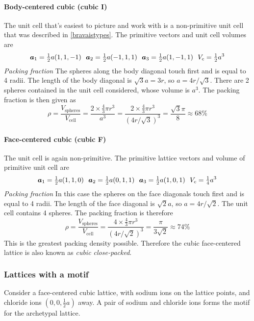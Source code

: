 \paragraph{Body-centered cubic (cubic I)} 
The unit cell that's easiest to picture and work with is a non-primitive unit cell that was described in \cref{bravaistypes}. The primitive vectors and unit cell volumes are 
\begin{equation*}
	\bvec{a}_1=\tfrac{1}{2}a(1,1,-1)\ \ \bvec{a}_2=\tfrac{1}{2}a(-1,1,1)\ \ \bvec{a}_3=\tfrac{1}{2}a(1,-1,1)\ \ V_c=\tfrac{1}{2}a^3
\end{equation*}
\emph{Packing fraction}
The spheres along the body diagonal touch first and is equal to 4 radii. The length of the body diagonal is $\sqrt{3}a=3r$, so $a=4r/\sqrt{3}$. There are 2 spheres contained in the unit cell considered, whose volume is $a^3$. The packing fraction is then given as
\begin{equation}
 	\rho=\frac{V_{\mathrm{spheres}}}{V_{\mathrm{cell}}}=\frac{2\times\tfrac{4}{3}\pi r^3}{a^3}=\frac{2\times\tfrac{4}{3}\pi r^3}{(4r/\sqrt{3})^3}=\frac{\sqrt{3}\pi}{8}\approx68\%
\end{equation} 
\paragraph{Face-centered cubic (cubic F)} 
The unit cell is again non-primitive. The primitive lattice vectors and volume of primitive unit cell are
\begin{equation}
	\bvec{a}_1=\tfrac{1}{2}a(1,1,0)\ \ \bvec{a}_2=\tfrac{1}{2}a(0,1,1)\ \ \bvec{a}_3=\tfrac{1}{2}a(1,0,1)\ \ V_c=\tfrac{1}{4}a^3
\end{equation}
\emph{Packing fraction}
In this case the spheres on the face diagonals touch first and is equal to 4 radii. The length of the face diagonal is $\sqrt{2}a$, so $a=4r/\sqrt{2}$. The unit cell contains 4 spheres. The packing fraction is therefore
\begin{equation}
	\rho=\frac{V_{\mathrm{spheres}}}{V_{\mathrm{cell}}}=\frac{4\times\tfrac{4}{3}\pi r^3}{(4r/\sqrt{2})^3}=\frac{\pi}{3\sqrt{2}}\approx74\%
\end{equation}
This is the greatest packing density possible. Therefore the cubic face-centered lattice is also known as \emph{cubic close-packed}. 
\subsubsection{Lattices with a motif}
Consider a face-centered cubic lattice, with sodium ions on the lattice points, and chloride ions $(0,0,\tfrac{1}{2}a)$ away. A pair of sodium and chloride ions forms the motif for the archetypal  lattice.

